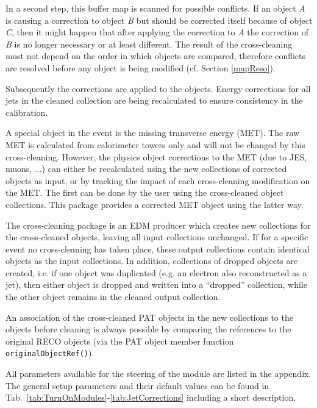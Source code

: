 \documentclass{cmspaper}
\begin{document}
In a second step, this buffer map is scanned for possible conflicts.
If an object {\it A} is causing a correction to object {\it B} but should
be corrected itself because of object {\it C}, then it might happen that after
applying the correction to {\it A} the correction of {\it B} is no longer
necessary or at least different.
The result of the cross-cleaning must not depend on the order in which objects
are compared, therefore conflicts are resolved before any object is being
modified (cf. Section \ref{mapReso}).

Subsequently the corrections are applied to the objects. Energy corrections for
all jets in the cleaned collection are being recalculated to ensure consistency
in the calibration.

A special object in the event is the missing transverse energy (MET). The raw
MET is calculated from calorimeter towers only and will not be changed by this
cross-cleaning. However, the physics object corrections to the MET (due to JES,
muons, ...) can either be
recalculated using the new collections of corrected objects as input, or by
tracking the impact of each cross-cleaning modification on the MET. The first
can be done by the user using the cross-cleaned object collections. This
package provides a corrected MET object using the latter way.

The cross-cleaning package is an EDM producer which creates new collections for
the cross-cleaned objects, leaving all input collections unchanged. If for a
specific event no cross-cleaning has taken place, these output collections
contain identical objects as the input collections.  In addition, collections
of dropped objects are created, i.e. if one object was duplicated (e.g. an
electron also reconstructed as a jet), then either object is dropped and
written into a ``dropped'' collection, while the other object remains in the
cleaned output collection.

An association of the cross-cleaned PAT objects in the new collections to the
objects before cleaning is always possible by comparing the references to the
original RECO objects (via the PAT object member function
\\\texttt{originalObjectRef()}). 

All parameters available for the steering of the module are listed in the
appendix. The general setup parameters and their default values can be found in
Tab.~\ref{tab:TurnOnModules}-\ref{tab:JetCorrections} including a short
description.
\end{document}
